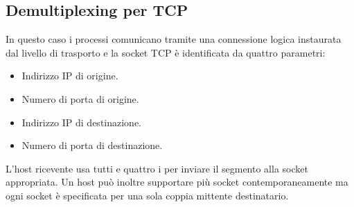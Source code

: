 \subsection{Demultiplexing per TCP}
In questo caso i processi comunicano tramite una connessione logica 
instaurata dal livello di trasporto e la socket TCP è identificata da 
quattro parametri:
\begin{itemize}
	\item Indirizzo IP di origine.
	\item Numero di porta di origine.
	\item Indirizzo IP di destinazione.
	\item Numero di porta di destinazione.
\end{itemize}
L'host ricevente usa tutti e quattro i per inviare il segmento alla 
socket appropriata. Un host può inoltre supportare più socket 
contemporaneamente ma ogni socket è specificata per una sola coppia
mittente destinatario.
